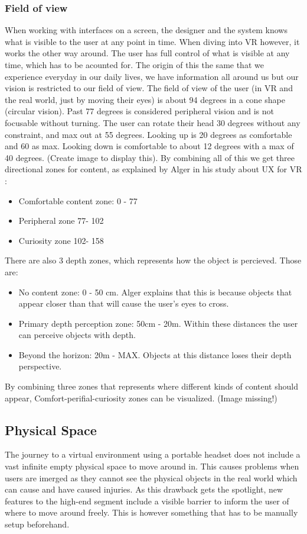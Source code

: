 \subsubsection{Field of view}
When working with interfaces on a screen, the designer and the system knows what is visible to the user at any point in time. When diving into VR however, it works the other way around. The user has full control of what is visible at any time, which has to be acounted for. The origin of this the same that we experience everyday in our daily lives, we have information all around us but our vision is restricted to our field of view. The field of view of the user (in VR and the real world, just by moving their eyes) is about 94 degrees in a cone shape (circular vision). Past 77 degrees is considered peripheral vision and is not focusable without turning. The user can rotate their head 30 degrees without any constraint, and max out at 55 degrees. Looking up is 20 degrees as comfortable and 60 as max. Looking down is comfortable to about 12 degrees with a max of 40 degrees. (Create image to display this). By combining all of this we get three directional zones for content, as explained by Alger in his study about UX for VR \cite{UX:Alger2015}:
\begin{itemize}
  \item Comfortable content zone: 0 - 77\degree
  \item Peripheral zone 77\degree - 102\degree
  \item Curiosity zone 102\degree - 158\degree
\end{itemize}
There are also 3 depth zones, which represents how the object is percieved. Those are:
\begin{itemize}
\item No content zone: 0 - 50 cm. Alger explains that this is because objects that appear closer than that will cause the user's eyes to cross.
\item Primary depth perception zone: 50cm - 20m. Within these distances the user can perceive objects with depth.
\item Beyond the horizon: 20m - MAX. Objects at this distance loses their depth perspective.
\end{itemize}
By combining three zones that represents where different kinds of content should appear,  Comfort-perifial-curiosity zones can be visualized. \cite{UX:Alger2015} (Image missing!)
\subsection{Physical Space}
The journey to a virtual environment using a portable headset does not include a vast infinite empty physical space to move around in. This causes problems when users are imerged as they cannot see the physical objects in the real world which can cause and have caused injuries.\cite{VR_injuries:2_allen_2017,VR_injuries:steamed} As this drawback gets the spotlight, new features to the high-end segment include a visible barrier to inform the user of where to move around freely. This is however something that has to be manually setup beforehand.\cite{VR_injuries:6_machkovech_2017}
